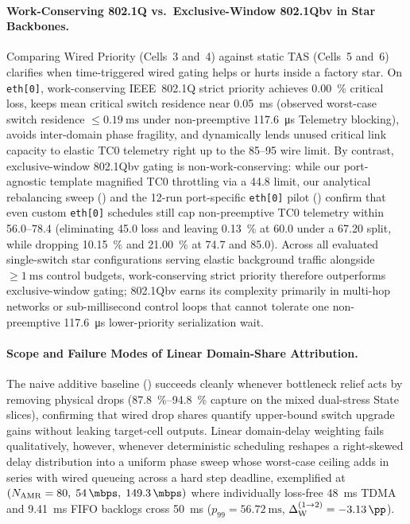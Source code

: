 \documentclass[11pt,a4paper]{article}
\newcommand{\Namr}{\ensuremath{N_{\mathrm{AMR}}}}
\newcommand{\GainWpair}{\ensuremath{\Delta_{\mathrm{W}}^{(1\to 2)}}}
\begin{document}
\paragraph{Work-Conserving 802.1Q vs.\ Exclusive-Window 802.1Qbv in Star Backbones.}
Comparing Wired Priority (Cells~3 and~4) against static TAS (Cells~5 and~6) clarifies when time-triggered wired gating helps or hurts inside a factory star. On \texttt{eth[0]}, work-conserving IEEE~802.1Q strict priority achieves \qty{0.00}{\percent} critical loss, keeps mean critical switch residence near \qty{0.05}{\milli\second} (observed worst-case switch residence $\le \qty{0.19}{\milli\second}$ under non-preemptive \qty{117.6}{\micro\second} Telemetry blocking), avoids inter-domain phase fragility, and dynamically lends unused critical link capacity to elastic TC0 telemetry right up to the \qtyrange{85}{95}{\mbps} wire limit. By contrast, exclusive-window 802.1Qbv gating is non-work-conserving: while our port-agnostic template magnified TC0 throttling via a \qty{44.8}{\mbps} limit, our analytical rebalancing sweep () and the 12-run port-specific \texttt{eth[0]} pilot () confirm that even custom \texttt{eth[0]} schedules still cap non-preemptive TC0 telemetry within \qtyrange{56.0}{78.4}{\mbps} (eliminating \qty{45.0}{\mbps} loss and leaving \qty{0.13}{\percent} at \qty{60.0}{\mbps} under a \qty{67.20}{\mbps} split, while dropping \qty{10.15}{\percent} and \qty{21.00}{\percent} at \qty{74.7}{\mbps} and \qty{85.0}{\mbps}). Across all evaluated single-switch star configurations serving elastic background traffic alongside $\ge \qty{1}{\milli\second}$ control budgets, work-conserving strict priority therefore outperforms exclusive-window gating; 802.1Qbv earns its complexity primarily in multi-hop networks or sub-millisecond control loops that cannot tolerate one non-preemptive \qty{117.6}{\micro\second} lower-priority serialization wait.

\paragraph{Scope and Failure Modes of Linear Domain-Share Attribution.}
The naive additive baseline () succeeds cleanly whenever bottleneck relief acts by removing physical drops (\qtyrange{87.8}{94.8}{\percent} capture on the mixed dual-stress State slices), confirming that wired drop shares quantify upper-bound switch upgrade gains without leaking target-cell outputs. Linear domain-delay weighting fails qualitatively, however, whenever deterministic scheduling reshapes a right-skewed delay distribution into a uniform phase sweep whose worst-case ceiling adds in series with wired queueing across a hard step deadline, exemplified at $(\Namr=80,\; \qty{54}{\mbps},\; \qty{149.3}{\mbps})$ where individually loss-free \qty{48}{\milli\second} TDMA and \qty{9.41}{\milli\second} FIFO backlogs cross \qty{50}{\milli\second} ($p_{99} = \qty{56.72}{\milli\second}$, $\GainWpair = \qty{-3.13}{\pp}$).
\end{document}
